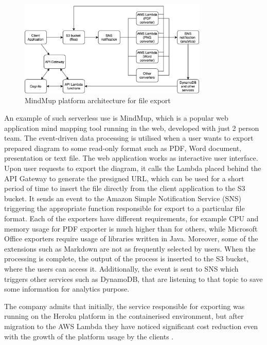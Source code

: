 \begin{figure}[h]
    \centering
    \includegraphics[width=0.8\textwidth]{assets/02-serverless/MindMupArchitecture.png}
    \caption{MindMup platform architecture for file export}
    \label{fig:mindmup-architecture-diagram}
\end{figure}

An example of such serverless use is MindMup, which is a popular web application mind mapping tool running in the web, developed with just 2 person team. The event-driven data processing is utilised when a user wants to export prepared diagram to some read-only format such as PDF, Word document, presentation or text file. The web application works as interactive user interface. Upon user requests to export the diagram, it calls the Lambda placed behind the API Gateway to generate the presigned URL, which can be used for a short period of time to insert the file directly from the client application to the S3 bucket. It sends an event to the Amazon Simple Notification Service (SNS) triggering the appropriate function responsible for export to a particular file format. Each of the exporters have different requirements, for example CPU and memory usage for PDF exporter is much higher than for others, while Microsoft Office exporters require usage of libraries written in Java. Moreover, some of the extensions such as Markdown are not as frequently selected by users. When the processing is complete, the output of the process is inserted to the S3 bucket, where the users can access it. Additionally, the event is sent to SNS which triggers other services such as DynamoDB, that are listening to that topic to save some information for analytics purpose.

The company admits that initially, the service responsible for exporting was running on the Heroku platform in the containerised environment, but after migration to the AWS Lambda they have noticed significant cost reduction even with the growth of the platform usage by the clients \cite{ServerlessApplicationsWithNodejs}.

